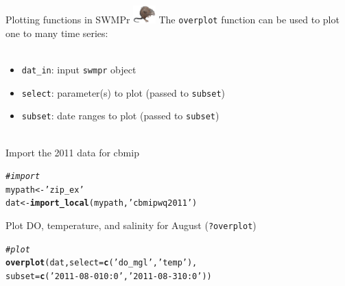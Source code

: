 \documentclass[xcolor=dvipsnames]{beamer}\usepackage[]{graphicx}\usepackage[]{color}
\makeatletter
\newcommand{\hlstr}[1]{\textcolor[rgb]{0.192,0.494,0.8}{#1}}%
\newcommand{\hlcom}[1]{\textcolor[rgb]{0.678,0.584,0.686}{\textit{#1}}}%
\newcommand{\hlstd}[1]{\textcolor[rgb]{0.345,0.345,0.345}{#1}}%
\newcommand{\hlkwb}[1]{\textcolor[rgb]{0.69,0.353,0.396}{#1}}%
\newcommand{\hlkwc}[1]{\textcolor[rgb]{0.333,0.667,0.333}{#1}}%
\newcommand{\hlkwd}[1]{\textcolor[rgb]{0.737,0.353,0.396}{\textbf{#1}}}%
\newenvironment{kframe}{%
 \def\at@end@of@kframe{}%
 \ifinner\ifhmode%
  \def\at@end@of@kframe{\end{minipage}}%
  \begin{minipage}{\columnwidth}%
 \fi\fi%
 \def\FrameCommand##1{\hskip\@totalleftmargin \hskip-\fboxsep
 \colorbox{shadecolor}{##1}\hskip-\fboxsep
     \hskip-\linewidth \hskip-\@totalleftmargin \hskip\columnwidth}%
 \MakeFramed {\advance\hsize-\width
   \@totalleftmargin\z@ \linewidth\hsize
   \@setminipage}}%
 {\par\unskip\endMakeFramed%
 \at@end@of@kframe}
\newenvironment{knitrout}{}{} %
\makeatother
\begin{document}
\begin{frame}[fragile, t]{Plotting functions in SWMPr \includegraphics[width = 0.065\textwidth]{imgs/swmprat.png}}
The \texttt{overplot} function can be used to plot one to many time series:\\~\\
\begin{itemize}
\item \texttt{dat_in}: input \texttt{swmpr} object
\item \texttt{select}: parameter(s) to plot (passed to \texttt{subset})
\item \texttt{subset}: date ranges to plot (passed to \texttt{subset})\\~\\
\end{itemize}
Import the 2011 data for cbmip
\begin{knitrout}\scriptsize
{}\color{fgcolor}\begin{kframe}
\begin{alltt}
\hlcom{# import}
\hlstd{mypath} \hlkwb{<-} \hlstr{'zip_ex'}
\hlstd{dat} \hlkwb{<-} \hlkwd{import_local}\hlstd{(mypath,} \hlstr{'cbmipwq2011'}\hlstd{)}
\end{alltt}
\end{kframe}
\end{knitrout}
Plot DO, temperature, and salinity for August (\texttt{?overplot})
\begin{knitrout}\scriptsize
{}\color{fgcolor}\begin{kframe}
\begin{alltt}
\hlcom{# plot}
\hlkwd{overplot}\hlstd{(dat,} \hlkwc{select} \hlstd{=} \hlkwd{c}\hlstd{(}\hlstr{'do_mgl'}\hlstd{,} \hlstr{'temp'}\hlstd{),}
  \hlkwc{subset} \hlstd{=} \hlkwd{c}\hlstd{(}\hlstr{'2011-08-01 0:0'}\hlstd{,} \hlstr{'2011-08-31 0:0'}\hlstd{))}
\end{alltt}
\end{kframe}
\end{knitrout}
\end{frame}
\end{document}
